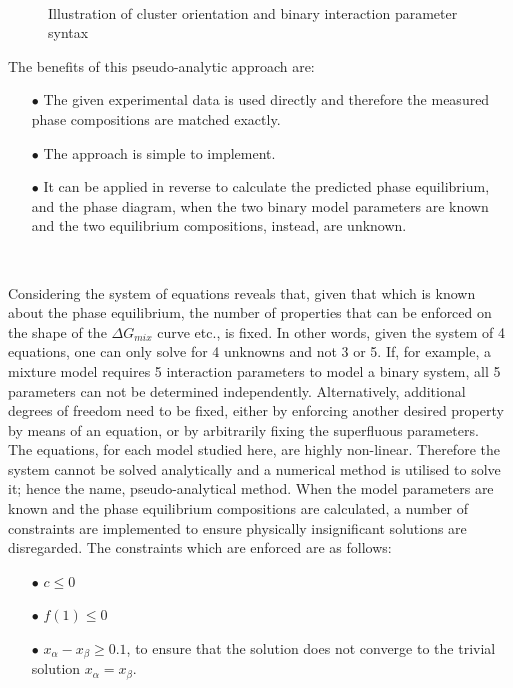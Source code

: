 \begin{figure}[t]
\begin{center}
\resizebox{0.7\textwidth}{!}{}\\
\end{center}
\caption{Illustration of cluster orientation and binary interaction parameter syntax} \label{BinaryParameterPAMethodDrawing}
\end{figure}	

The benefits of this pseudo-analytic approach are:\

\begin{itemize}
\item[$\bullet$] The given experimental data is used directly and therefore the measured phase compositions are matched exactly.\
\item[$\bullet$] The approach is simple to implement.\
\item[$\bullet$] It can be applied in reverse to calculate the predicted phase equilibrium, and the phase diagram, when the two binary model parameters are known and the two equilibrium compositions, instead, are unknown.\
\end{itemize}\

Considering the system of equations reveals that, given that which is known about the phase equilibrium, the number of properties that can be enforced on the shape of the $\Delta G_{mix}$ curve etc., is fixed. In other words, given the system of 4 equations, one can only solve for 4 unknowns and not 3 or 5. If, for example, a mixture model requires 5 interaction parameters to model a binary system, all 5 parameters can not be determined independently. Alternatively, additional degrees of freedom need to be fixed, either by enforcing another desired property by means of an equation, or by arbitrarily fixing the superfluous parameters.\\

The equations, for each model studied here, are highly non-linear. Therefore the system cannot be solved analytically and a numerical method is utilised to solve it; hence the name, pseudo-analytical method. When the model parameters are known and the phase equilibrium compositions are calculated,  a number of constraints are implemented to ensure physically insignificant solutions are disregarded. The constraints which are enforced are as follows:\

\begin{itemize}
\item[$\bullet$] $c \leq 0$
\item[$\bullet$] $f\left(1\right) \leq 0$
\item[$\bullet$] $x_{\alpha} - x_{\beta} \geq 0.1$, to ensure that the solution does not converge to the trivial solution $x_{\alpha} = x_{\beta}$.
\end{itemize}\

